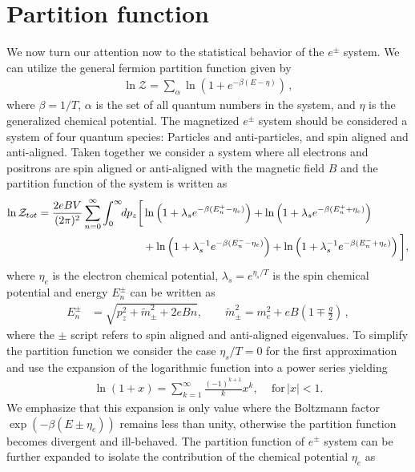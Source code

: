 \documentclass[Universe,article,submit,moreauthors,pdftex]{Definitions/mdpi}
\begin{document}
\section{Partition function}
\noindent We now turn our attention now to the statistical behavior of the $e^{\pm}$ system. We can utilize the general fermion partition function given by
\begin{align}
  \label{PartFunc} \ln\mathcal{Z}=\sum_{\alpha}\ln\left(1+e^{-\beta(E-\eta)}\right)\,,
\end{align}
where $\beta=1/T$, $\alpha$ is the set of all quantum numbers in the system, and $\eta$ is the generalized chemical potential. The magnetized $e^{\pm}$ system should be considered a system of four quantum species: Particles and anti-particles, and spin aligned and anti-aligned. Taken together we consider a system where all electrons and positrons are spin aligned or anti-aligned with the magnetic field $B$ and the partition function of the system is written as
\begin{align}
\ln\mathcal{Z}_{tot}=\frac{2eBV}{(2\pi)^2}\sum_{n=0}^\infty\int^\infty_{0} \!\!dp_z\bigg[&\ln\left(1+\lambda_s e^{-\beta(E_{n}^+-\eta_{e})}\right)+\ln\left(1+\lambda_s e^{-\beta(E_{n}^++\eta_{e})}\right)\notag\\
&+\ln\left(1+\lambda^{-1}_s e^{-\beta(E_{n}^--\eta_{e})}\right)+\ln\left(1+\lambda_s^{-1} e^{-\beta(E_{n}^-+\eta_{e})}\right)\bigg],
\end{align}
where $\eta_{e}$ is the electron chemical potential, $\lambda_s=e^{\eta_s/T}$ is the spin chemical potential%
and energy $E_{n}^\pm$ can be written as
\begin{align}
E_{n}^\pm&=\sqrt{p^2_z+\tilde m^2_\pm+2eBn},\qquad\tilde{m}^2_\pm=m^2_e+eB\left(1\mp\frac{g}{2}\right)\,,
\end{align}
where the $\pm$ script refers to spin aligned and anti-aligned eigenvalues. To simplify the partition function we consider the case $\eta_s/T=0$ for the first approximation and use the expansion of the logarithmic function into a power series yielding
\begin{align}
\ln\left(1+x\right)=\sum^{\infty}_{k=1}\frac{(-1)^{k+1}}{k}x^k, \,\,\,\,\,\,\,\mathrm{for}\,|x|<1.
\end{align}
We emphasize that this expansion is only value where the Boltzmann factor $\exp\left(-\beta(E\pm\eta_{e})\right)$ remains less than unity, otherwise the partition function becomes divergent and ill-behaved. The partition function of $e^{\pm}$ system can be further expanded to isolate the contribution of the chemical potential $\eta_{e}$ as
\end{document}
